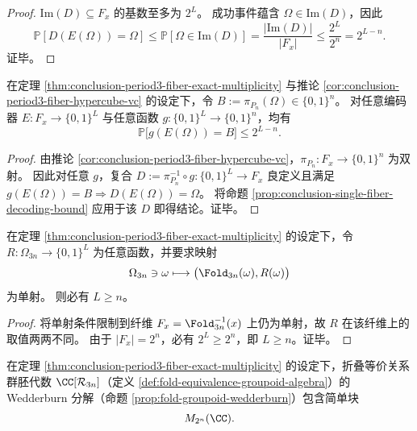 \begin{proof}
\(\mathrm{Im}(D)\subseteq F_x\) 的基数至多为 \(2^L\)。
成功事件蕴含 \(\Omega\in\mathrm{Im}(D)\)，因此
\[
\mathbb{P}[D(E(\Omega))=\Omega]\le \mathbb{P}[\Omega\in\mathrm{Im}(D)]
  =\frac{|\mathrm{Im}(D)|}{|F_x|}
  \le \frac{2^L}{2^n}=2^{L-n}.
\]
证毕。
\end{proof}

\begin{corollary}[周期纤维的微观证据提取上界]\label{cor:conclusion-single-fiber-assignment-extraction-bound}
在定理 \ref{thm:conclusion-period3-fiber-exact-multiplicity} 与推论 \ref{cor:conclusion-period3-fiber-hypercube-vc} 的设定下，令
\(
B:=\pi_{P_n}(\Omega)\in\{0,1\}^n
\)。
对任意编码器 \(E:F_x\to\{0,1\}^L\) 与任意函数 \(g:\{0,1\}^L\to\{0,1\}^n\)，均有
\[
\mathbb{P}\bigl[g(E(\Omega))=B\bigr]\le 2^{L-n}.
\]
\end{corollary}

\begin{proof}
由推论 \ref{cor:conclusion-period3-fiber-hypercube-vc}，\(\pi_{P_n}:F_x\to\{0,1\}^n\) 为双射。
因此对任意 \(g\)，复合 \(D:=\pi_{P_n}^{-1}\circ g:\{0,1\}^L\to F_x\) 良定义且满足
\(
g(E(\Omega))=B \Rightarrow D(E(\Omega))=\Omega
\)。
将命题 \ref{prop:conclusion-single-fiber-decoding-bound} 应用于该 \(D\) 即得结论。证毕。
\end{proof}

\begin{proposition}[使折叠注入化所需的外置信息线性下界]\label{prop:conclusion-single-fiber-injectivization-sideinfo-lb}
在定理 \ref{thm:conclusion-period3-fiber-exact-multiplicity} 的设定下，令 \(R:\Omega_{3n}\to\{0,1\}^L\) 为任意函数，并要求映射
\[
\Omega_{3n}\ni\omega\longmapsto \bigl(\Fold_{3n}(\omega),R(\omega)\bigr)
\]
为单射。
则必有 \(L\ge n\)。
\end{proposition}

\begin{proof}
将单射条件限制到纤维 \(F_x=\Fold_{3n}^{-1}(x)\) 上仍为单射，故 \(R\) 在该纤维上的取值两两不同。
由于 \(|F_x|=2^n\)，必有 \(2^L\ge 2^n\)，即 \(L\ge n\)。证毕。
\end{proof}

\begin{corollary}[折叠等价关系群胚代数中的指数级矩阵块]\label{cor:conclusion-single-fiber-wedderburn-big-block}
在定理 \ref{thm:conclusion-period3-fiber-exact-multiplicity} 的设定下，折叠等价关系群胚代数 \(\CC[\mathcal{R}_{3n}]\)（定义 \ref{def:fold-equivalence-groupoid-algebra}）的 Wedderburn 分解（命题 \ref{prop:fold-groupoid-wedderburn}）包含简单块
\[
M_{2^n}(\CC).
\]
\end{corollary}

